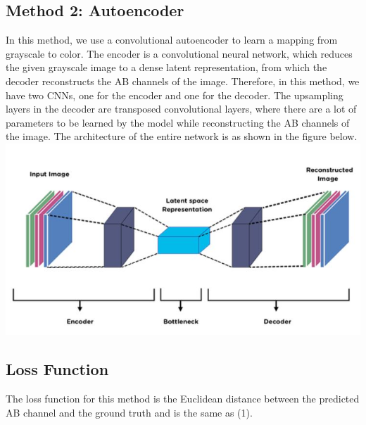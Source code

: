\documentclass{article}
\begin{document}

\subsection{Method 2: Autoencoder}
In this method, we use a convolutional autoencoder to learn a mapping from grayscale to color.
The encoder is a convolutional neural network, which reduces the given grayscale image to a dense latent representation, from which the decoder reconstructs the AB channels of the image.
Therefore, in this method, we have two CNNs, one for the encoder and one for the decoder.
The upsampling layers in the decoder are transposed convolutional layers, where there are a lot of parameters to be learned by the model while reconstructing the AB channels of the image.
The architecture of the entire network is as shown in the figure below.
\\
\includegraphics{autoencoder.jpg}


\subsection{Loss Function}
The loss function for this method is the Euclidean distance between the predicted AB channel and the ground truth and is the same as (1).

\end{document}
